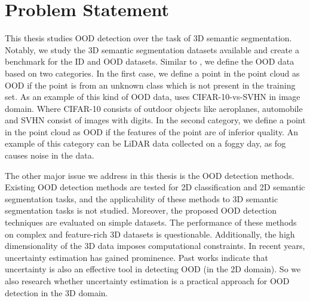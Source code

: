 \section{Problem Statement}
This thesis studies OOD detection over the task of 3D semantic segmentation.
Notably, we study the 3D semantic segmentation datasets available and create a benchmark for the ID and OOD datasets.
Similar to \cite{Cao}, we define the OOD data based on two categories.
In the first case, we define a point in the point cloud as OOD if the point is from an unknown class which is not present in the training set.
As an example of this kind of OOD data, \cite{liang2017enhancing_ODIN} uses CIFAR-10-vs-SVHN in image domain.
Where CIFAR-10 consists of outdoor objects like aeroplanes, automobile and SVHN consist of images with digits.
In the second category, we define a point in the point cloud as OOD if the features of the point are of inferior quality.
An example of this category can be LiDAR data collected on a foggy day, as fog causes noise in the data.


The other major issue we address in this thesis is the OOD detection methods. 
Existing OOD detection methods are tested for 2D classification and 2D semantic segmentation tasks, and the applicability of
these methods to 3D semantic segmentation tasks is not studied. Moreover, the proposed OOD detection
techniques are evaluated on simple datasets. The performance of these methods on complex and
feature-rich 3D datasets is questionable. Additionally, the high dimensionality of the 3D data imposes computational constraints. In recent years, uncertainty estimation has gained prominence. Past works
indicate that uncertainty is also an effective tool in detecting OOD (in the 2D domain). So we also research
whether uncertainty estimation is a practical approach for OOD detection in the 3D domain.
% 

